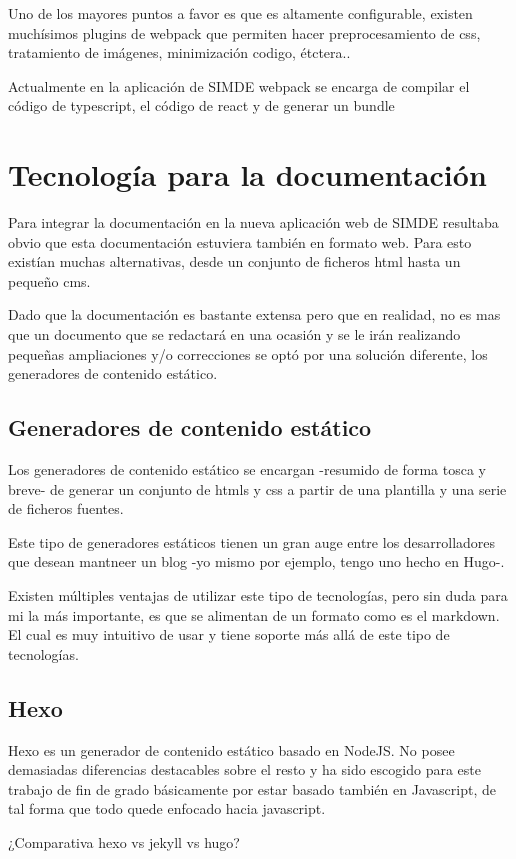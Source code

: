 \bigskip
Uno de los mayores puntos a favor es que es altamente configurable, existen muchísimos 
plugins de webpack que permiten hacer preprocesamiento de css, tratamiento de imágenes,
minimización codigo, étctera.. 

\bigskip
Actualmente en la aplicación de SIMDE webpack  se encarga de compilar el código de 
typescript, el código de react y de generar un bundle 

\section{Tecnología para la documentación}
\label{3:sec4}

Para integrar la documentación en la nueva aplicación web de SIMDE resultaba obvio que esta documentación
estuviera también en formato web. Para esto existían muchas alternativas, desde un conjunto de ficheros
html hasta un pequeño cms. 

Dado que la documentación es bastante extensa pero que en realidad, no es mas que un documento 
que se redactará en una ocasión y se le irán realizando pequeñas ampliaciones y/o correcciones
se optó por una solución diferente, los generadores de contenido estático.

\subsection{Generadores de contenido estático}

Los generadores de contenido estático se encargan -resumido de forma tosca y breve- de generar 
un conjunto de htmls y css a partir de una plantilla y una serie de ficheros fuentes. 

\bigskip
Este tipo de generadores estáticos tienen un gran auge entre los desarrolladores que desean 
mantneer un blog -yo mismo por ejemplo, tengo uno hecho en Hugo-. 

\bigskip 
Existen múltiples ventajas de utilizar este tipo de tecnologías, pero sin duda para mi la más
importante, es que se alimentan de un formato como es el markdown. El cual es muy intuitivo de 
usar y tiene soporte más allá de este tipo de tecnologías. 

\subsection{Hexo}

Hexo es un generador de contenido estático basado en NodeJS. No posee demasiadas diferencias destacables
sobre el resto y ha sido escogido para este trabajo de fin de grado básicamente por estar basado 
también en Javascript, de tal forma que todo quede enfocado hacia javascript.

\bigskip
¿Comparativa hexo vs jekyll vs hugo?

